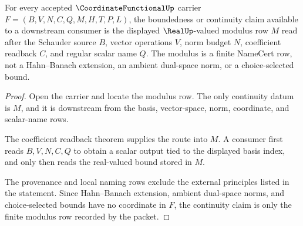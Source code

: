 \begin{theorem}
\label{thm:coordinate-functional-continuity-modulus}
For every accepted $\CoordinateFunctionalUp$ carrier $F=(B,V,N,C,Q,M,H,T,P,L)$, the boundedness or continuity claim available to a downstream consumer is the displayed $\RealUp$-valued modulus row $M$ read after the Schauder source $B$, vector operations $V$, norm budget $N$, coefficient readback $C$, and regular scalar name $Q$. The modulus is a finite NameCert row, not a Hahn--Banach extension, an ambient dual-space norm, or a choice-selected bound.
\end{theorem}
\begin{proof}
Open the carrier and locate the modulus row. The only continuity datum is $M$, and it is downstream from the basis, vector-space, norm, coordinate, and scalar-name rows.

The coefficient readback theorem supplies the route into $M$. A consumer first reads $B,V,N,C,Q$ to obtain a scalar output tied to the displayed basis index, and only then reads the real-valued bound stored in $M$.

The provenance and local naming rows exclude the external principles listed in the statement. Since Hahn--Banach extension, ambient dual-space norms, and choice-selected bounds have no coordinate in $F$, the continuity claim is only the finite modulus row recorded by the packet.
\end{proof}


